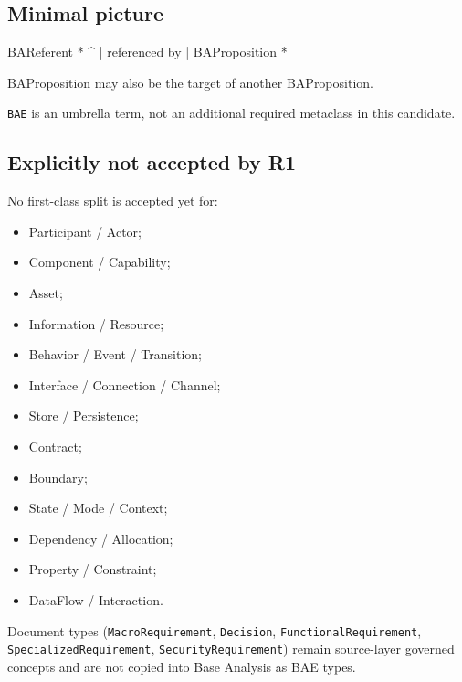 \documentclass[
]{article}
\newenvironment{Shaded}{}{}
\newcommand{\NormalTok}[1]{#1}
\providecommand{\tightlist}{%
  \setlength{\itemsep}{0pt}\setlength{\parskip}{0pt}}
\begin{document}
\subsection{Minimal picture}\label{minimal-picture}

\begin{Shaded}
\begin{Highlighting}[]
\NormalTok{BAReferent *}
\NormalTok{     \^{}}
\NormalTok{     | referenced by}
\NormalTok{     |}
\NormalTok{BAProposition *}

\NormalTok{BAProposition may also be the target of another BAProposition.}
\end{Highlighting}
\end{Shaded}

\texttt{BAE} is an umbrella term, not an additional required metaclass
in this candidate.

\subsection{Explicitly not accepted by
R1}\label{explicitly-not-accepted-by-r1}

No first-class split is accepted yet for:

\begin{itemize}
\tightlist
\item
  Participant / Actor;
\item
  Component / Capability;
\item
  Asset;
\item
  Information / Resource;
\item
  Behavior / Event / Transition;
\item
  Interface / Connection / Channel;
\item
  Store / Persistence;
\item
  Contract;
\item
  Boundary;
\item
  State / Mode / Context;
\item
  Dependency / Allocation;
\item
  Property / Constraint;
\item
  DataFlow / Interaction.
\end{itemize}

Document types (\texttt{MacroRequirement}, \texttt{Decision},
\texttt{FunctionalRequirement}, \texttt{SpecializedRequirement},
\texttt{SecurityRequirement}) remain source-layer governed concepts and
are not copied into Base Analysis as BAE types.
\end{document}
